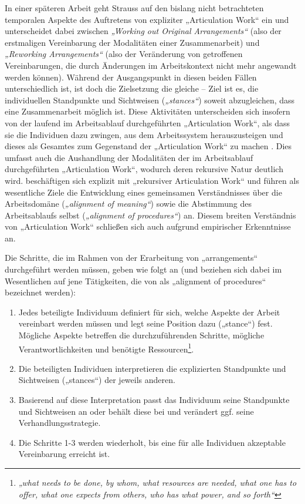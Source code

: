 In einer späteren Arbeit geht Strauss auf den bislang nicht betrachteten temporalen Aspekte des Auftretens von expliziter „Articulation Work“ ein \citep{Corbin93} und unterscheidet dabei zwischen \emph{„Working out Original Arrangements“} (also der erstmaligen Vereinbarung der Modalitäten einer Zusammenarbeit) und \emph{„Reworking Arrangements“} (also der Veränderung von getroffenen Vereinbarungen, die durch Änderungen im Arbeitskontext nicht mehr angewandt werden können). Während der Ausgangspunkt in diesen beiden Fällen unterschiedlich ist, ist doch die Zielsetzung die gleiche -- Ziel ist es, die individuellen Standpunkte und Sichtweisen (\emph{„stances“}) soweit abzugleichen, dass eine Zusammenarbeit möglich ist. Diese Aktivitäten unterscheiden sich insofern von der laufend im Arbeitsablauf durchgeführten „Articulation Work“, als dass sie die Individuen dazu zwingen, aus dem Arbeitssystem herauszusteigen und dieses als Gesamtes zum Gegenstand der „Articulation Work“ zu machen \citep{Corbin93}. Dies umfasst auch die Aushandlung der Modalitäten der im Arbeitsablauf durchgeführten „Articulation Work“, wodurch deren rekursive Natur \citep{Star99} deutlich wird. \citet{Sarini02} beschäftigen sich explizit mit „rekursiver Articulation Work“ und führen als wesentliche Ziele die Entwicklung eines gemeinsamen Verständnisses über die Arbeitsdomäne (\emph{„alignment of meaning“}) sowie die Abstimmung des Arbeitsablaufs selbst (\emph{„alignment of procedures“}) an. Diesem breiten Verständnis von „Articulation Work“ schließen sich auch \citet{Baker07} aufgrund empirischer Erkenntnisse an.

\label{steps:corbin} Die Schritte, die im Rahmen von der Erarbeitung von „arrangements“ durchgeführt werden müssen, geben \citet{Corbin93} wie folgt an (und beziehen sich dabei im Wesentlichen auf jene Tätigkeiten, die von \citet{Sarini02} als „alignment of procedures“ bezeichnet werden):
\begin{enumerate}
	\item Jedes beteiligte Individuum definiert für sich, welche Aspekte der Arbeit vereinbart werden müssen und legt seine Position dazu („stance“) fest. Mögliche Aspekte betreffen die durchzuführenden Schritte, mögliche Verantwortlichkeiten und benötigte Ressourcen\footnote{\emph{„what needs to be done, by whom, what resources are needed, what one has to offer, what one expects from others, who has what power, and so forth“}\citep[][S. 76]{Corbin93}}. 
	\item Die beteiligten Individuen interpretieren die explizierten Standpunkte und Sichtweisen („stances“) der jeweils anderen. 
	\item Basierend auf diese Interpretation passt das Individuum seine Standpunkte und Sichtweisen an oder behält diese bei und verändert ggf. seine Verhandlungsstrategie.
	\item Die Schritte 1-3 werden wiederholt, bis eine für alle Individuen akzeptable Vereinbarung erreicht ist.
\end{enumerate}

